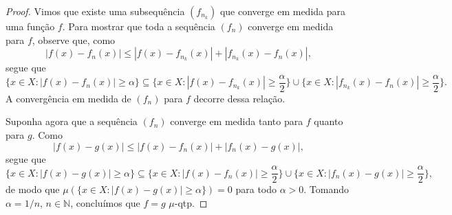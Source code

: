 \begin{proof}
    Vimos que existe uma subsequência $(f_{n_k})$ que converge em medida para uma função $f$. Para mostrar que toda a sequência $(f_n)$ converge em medida para $f$, observe que, como
    \begin{equation*}
        |f(x) - f_n(x)| \leq |f(x) - f_{n_k}(x)| + |f_{n_k}(x) - f_n(x)|,
    \end{equation*}
    segue que
    \begin{equation*}
        \{x \in X : |f(x) - f_n(x)| \geq \alpha\} \subseteq \{x \in X : |f(x) - f_{n_k}(x)| \geq \frac{\alpha}{2}\} \cup \{x \in X : |f_{n_k}(x) - f_n(x)| \geq \frac{\alpha}{2}\}.
    \end{equation*}
    A convergência em medida de $(f_n)$ para $f$ decorre dessa relação.

    Suponha agora que a sequência $(f_n)$ converge em medida tanto para $f$ quanto para $g$. Como
    \begin{equation*}
        |f(x) - g(x)| \leq |f(x) - f_n(x)| + |f_n(x) - g(x)|,
    \end{equation*}
    segue que
    \begin{equation*}
        \{x \in X : |f(x) - g(x)| \geq \alpha\} \subseteq \{x \in X : |f(x) - f_n(x)| \geq \frac{\alpha}{2}\} \cup \{x \in X : |f_n(x) - g(x)| \geq \frac{\alpha}{2}\},
    \end{equation*}
    de modo que $\mu(\{x \in X : |f(x) - g(x)| \geq \alpha\}) = 0$ para todo $\alpha > 0$. Tomando $\alpha = 1/n$, $n \in \mathbb{N}$, concluímos que $f = g$ \(\mu\)-qtp.
\end{proof}
